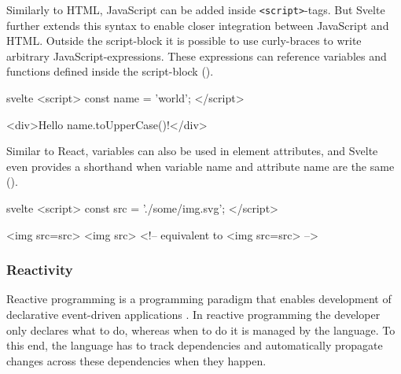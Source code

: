 Similarly to HTML, JavaScript can be added inside \texttt{<script>}-tags. But Svelte further extends this syntax to enable closer integration between JavaScript and HTML. Outside the script-block it is possible to use curly-braces to write arbitrary JavaScript-expressions. These expressions can reference variables and functions defined inside the script-block ().


\begin{listing}[h!]
\begin{myminted}{svelte}{}
<script>
  const name = 'world';
</script>

<div>Hello {name.toUpperCase()}!</div>
\end{myminted}
\caption{Example for JavaScript-expressions in Svelte.}
\label{fig:svelte-javascript-expression}
\end{listing}

Similar to React, variables can also be used in element attributes, and Svelte even provides a shorthand when variable name and attribute name are the same ().

\begin{listing}[h!]
\begin{myminted}{svelte}{}
<script>
  const src = './some/img.svg';
</script>

<img src={src}>
<img {src}> <!-- equivalent to <img src={src}> -->
\end{myminted}
\caption{Syntax for using variables in element-attributes.}
\label{fig:svelte-attribute-variables}
\end{listing}

\subsubsection{Reactivity}
\label{sec:svelte-reactivity}

Reactive programming is a programming paradigm that enables development of declarative event-driven applications \cite{bainomugisha_survey_2013}. In reactive programming the developer only declares what to do, whereas when to do it is managed by the language. To this end, the language has to track dependencies and automatically propagate changes across these dependencies when they happen.

